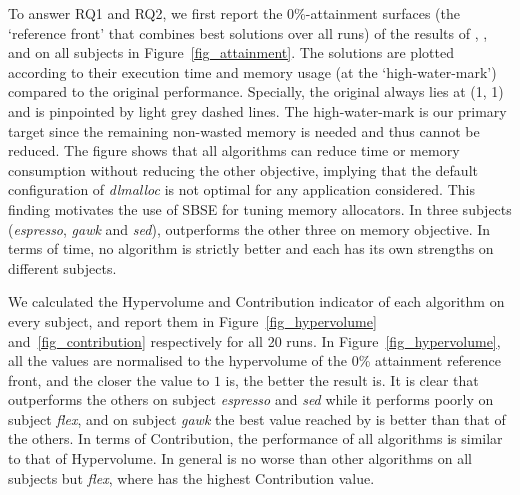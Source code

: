 To answer RQ1 and RQ2, we first report the 0\%-attainment surfaces (the `reference front' that combines best solutions over all runs) of the results of \sr{}, \sn{}, \dr{} and \dn{} on all subjects in Figure~\ref{fig_attainment}. The solutions are plotted according to their execution time and memory usage (at the `high-water-mark') compared to the original performance. Specially, the original always lies at (1, 1) and is pinpointed by light grey dashed lines. The high-water-mark is our primary target since the remaining non-wasted memory is needed and thus cannot be reduced. 
The figure shows that all algorithms can reduce time or memory consumption without reducing the other objective, implying that the default configuration of \emph{dlmalloc} is not optimal for any application considered. This finding motivates the use of SBSE for tuning memory allocators. In three subjects (\emph{espresso}, \emph{gawk} and \emph{sed}), \dn{} outperforms the other three on memory objective. In terms of time, no algorithm is strictly better and each has its own strengths on different subjects. 

We calculated the Hypervolume and Contribution indicator of each algorithm on every subject, and report them in Figure~\ref{fig_hypervolume} and~\ref{fig_contribution} respectively for all 20 runs. 
In Figure~\ref{fig_hypervolume}, all the values are normalised to the hypervolume of the 0\% attainment reference front, and the closer the value to $1$ is, the better the result is. It is clear that \dn{} outperforms the others on subject \emph{espresso} and \emph{sed} while it performs poorly on subject \emph{flex}, and on subject \emph{gawk} the best value reached by \dn{} is better than that of the others.
In terms of Contribution, the performance of all algorithms is similar to that of Hypervolume. In general \dn{} is no worse than other algorithms on all subjects but \emph{flex}, where \sn{} has the highest Contribution value.
 
